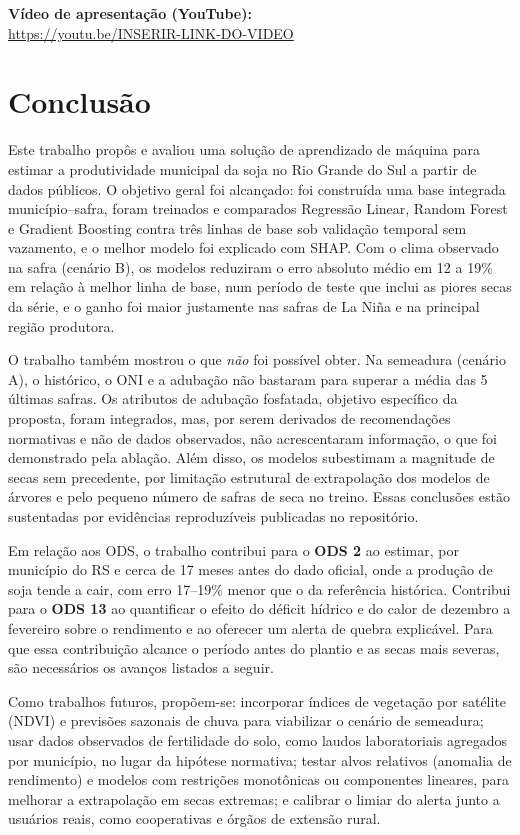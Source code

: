 \documentclass[12pt]{article}
\begin{document}
\noindent\textbf{Vídeo de apresentação (YouTube):}\\
\url{https://youtu.be/INSERIR-LINK-DO-VIDEO}

\section{Conclusão}

Este trabalho propôs e avaliou uma solução de aprendizado de máquina para
estimar a produtividade municipal da soja no Rio Grande do Sul a partir de
dados públicos. O objetivo geral foi alcançado: foi construída uma base
integrada município--safra, foram treinados e comparados Regressão Linear,
Random Forest e Gradient Boosting contra três linhas de base sob validação
temporal sem vazamento, e o melhor modelo foi explicado com SHAP. Com o
clima observado na safra (cenário B), os modelos reduziram o erro absoluto
médio em 12 a 19\% em relação à melhor linha de base, num período de teste
que inclui as piores secas da série, e o ganho foi maior justamente nas
safras de La Niña e na principal região produtora.

O trabalho também mostrou o que \emph{não} foi possível obter. Na semeadura
(cenário A), o histórico, o ONI e a adubação não bastaram para superar a
média das 5 últimas safras. Os atributos de adubação fosfatada, objetivo
específico da proposta, foram integrados, mas, por serem derivados de
recomendações normativas e não de dados observados, não acrescentaram
informação, o que foi demonstrado pela ablação. Além disso, os modelos
subestimam a magnitude de secas sem precedente, por limitação estrutural de
extrapolação dos modelos de árvores e pelo pequeno número de safras de seca
no treino. Essas conclusões estão sustentadas por evidências reproduzíveis
publicadas no repositório.

Em relação aos ODS, o trabalho contribui para o \textbf{ODS 2} ao estimar,
por município do RS e cerca de 17 meses antes do dado oficial, onde a
produção de soja tende a cair, com erro 17--19\% menor que o da referência
histórica. Contribui para o \textbf{ODS 13} ao quantificar o efeito do
déficit hídrico e do calor de dezembro a fevereiro sobre o rendimento e ao
oferecer um alerta de quebra explicável. Para que essa contribuição
alcance o período antes do plantio e as secas mais severas, são necessários
os avanços listados a seguir.

Como trabalhos futuros, propõem-se: incorporar índices de vegetação por
satélite (NDVI) e previsões sazonais de chuva para viabilizar o cenário de
semeadura; usar dados observados de fertilidade do solo, como laudos
laboratoriais agregados por município, no lugar da hipótese normativa;
testar alvos relativos (anomalia de rendimento) e modelos com restrições
monotônicas ou componentes lineares, para melhorar a extrapolação em secas
extremas; e calibrar o limiar do alerta junto a usuários reais, como
cooperativas e órgãos de extensão rural.
\end{document}
